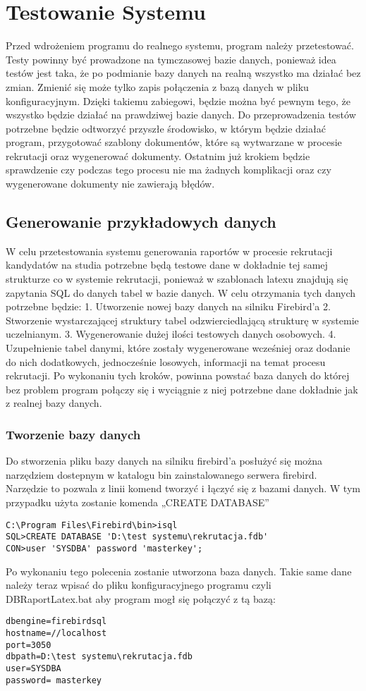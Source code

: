 \chapter{Testowanie Systemu}

Przed wdrożeniem programu do realnego systemu, program należy przetestować. Testy powinny być prowadzone na tymczasowej bazie danych, ponieważ idea testów jest taka, że po podmianie bazy danych na realną wszystko ma działać bez zmian. Zmienić się może tylko zapis połączenia z bazą danych w pliku konfiguracyjnym. Dzięki takiemu zabiegowi, będzie można być pewnym tego, że wszystko będzie działać na prawdziwej bazie danych.  Do przeprowadzenia testów potrzebne będzie  odtworzyć przyszłe środowisko, w którym będzie działać program, przygotować szablony dokumentów, które są wytwarzane w procesie rekrutacji oraz wygenerować dokumenty. Ostatnim już krokiem będzie sprawdzenie czy podczas tego procesu nie ma żadnych komplikacji oraz czy wygenerowane dokumenty nie zawierają błędów.

\section{ Generowanie przykładowych danych}

W celu przetestowania systemu generowania raportów w procesie rekrutacji kandydatów na studia potrzebne będą testowe dane w dokładnie tej samej strukturze co w systemie rekrutacji, ponieważ w szablonach latexu znajdują się zapytania SQL do danych tabel w bazie danych. 
W celu otrzymania tych danych potrzebne będzie:
1.	Utworzenie nowej bazy danych na silniku Firebird’a 
2.	Stworzenie wystarczającej struktury tabel odzwierciedlającą strukturę w systemie uczelnianym.
3.	Wygenerowanie dużej ilości testowych danych osobowych.
4.	Uzupełnienie tabel danymi, które zostały wygenerowane wcześniej oraz dodanie do nich dodatkowych, jednocześnie losowych, informacji na temat procesu rekrutacji.
Po wykonaniu tych kroków, powinna powstać baza danych do której bez problem program połączy się i wyciągnie z niej potrzebne dane dokładnie jak z realnej bazy danych.

\subsection{ Tworzenie bazy danych }

Do stworzenia pliku bazy danych na silniku firebird’a posłużyć się można narzędziem dostepnym w katalogu bin zainstalowanego serwera firebird.  Narzędzie to pozwala z linii komend tworzyć i łączyć się z bazami danych. W tym przypadku użyta zostanie komenda „CREATE DATABASE”
\begin{lstlisting}
C:\Program Files\Firebird\bin>isql
SQL>CREATE DATABASE 'D:\test systemu\rekrutacja.fdb'
CON>user 'SYSDBA' password 'masterkey';
\end{lstlisting}
Po wykonaniu tego polecenia zostanie utworzona baza danych. Takie same dane należy teraz wpisać do pliku konfiguracyjnego programu czyli DBRaportLatex.bat aby program mogł się połączyć z tą bazą:
\begin{lstlisting}
dbengine=firebirdsql
hostname=//localhost
port=3050
dbpath=D:\test systemu\rekrutacja.fdb
user=SYSDBA
password= masterkey
\end{lstlisting}

